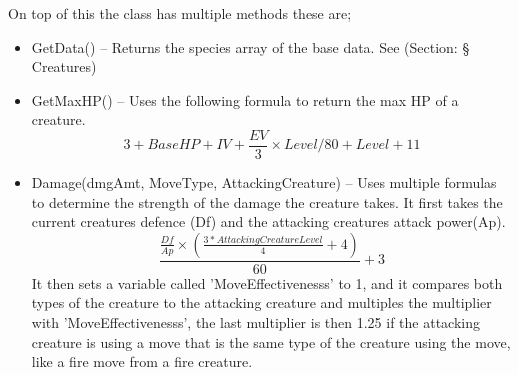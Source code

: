 \documentclass[11pt,a4paper]{article}
\begin{document}
On top of this the class has multiple methods these are;
\begin{itemize}
\item GetData() -- Returns the species array of the base data. See (Section: § Creatures)
\item GetMaxHP() -- Uses the following formula to return the max HP of a creature. $$3+ BaseHP +IV + \frac{EV}{3} \times Level / 80 +Level+11$$
\item Damage(dmgAmt, MoveType, AttackingCreature) -- Uses multiple formulas to determine the strength of the damage the creature takes.  It first takes the current creatures defence (Df) and the attacking creatures attack power(Ap).
$$\frac{\frac{Df}{Ap} \times (\frac{3 *AttackingCreatureLevel}{4} + 4)}{60} + 3
$$ It then sets a variable called 'MoveEffectivenesss' to 1, and it compares both types of the creature to the attacking creature and multiples the multiplier with 'MoveEffectivenesss', the last multiplier is then 1.25 if the attacking creature is using a move that is the same type of the creature using the move, like a fire move from a fire creature.
\end{itemize}

		
\end{document}

